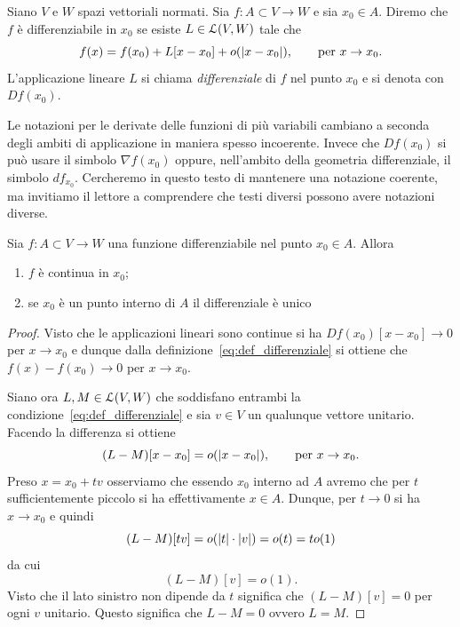 \begin{definition}
  Siano $V$ e $W$ spazi vettoriali normati.
  Sia $f\colon A \subset V \to W$ e sia $x_0\in A$.
  Diremo che $f$ è differenziabile in $x_0$ se esiste 
  $L\in \mathcal L(V,W)$ tale che 
  \begin{equation}\label{eq:def_differenziale}
    f(x) = f(x_0) + L[x- x_0] + o({\left|x - x_0\right|}), 
    \qquad \text{per } x\to x_0.
  \end{equation}
  L'applicazione lineare $L$
  si chiama \emph{differenziale} di $f$ nel punto $x_0$
  e si denota con $Df(x_0)$.
\end{definition}

\begin{remark}
Le notazioni per le derivate delle funzioni di più variabili cambiano 
a seconda degli ambiti di applicazione in maniera spesso incoerente.
Invece che $Df(x_0)$ si può usare il simbolo $\nabla f(x_0)$ oppure,
nell'ambito della geometria differenziale, il simbolo $df_{x_0}$. 
Cercheremo in questo testo di mantenere una notazione coerente, ma
invitiamo il lettore a comprendere che testi diversi possono avere 
notazioni diverse. 
\end{remark}

\begin{theorem}
Sia $f\colon A\subset V \to W$ una funzione 
differenziabile nel punto $x_0\in A$. Allora
\begin{enumerate}
  \item $f$ è continua in $x_0$;
  \item se $x_0$ è un punto interno di $A$
  il differenziale è unico
\end{enumerate}
\end{theorem}
\begin{proof}
Visto che le applicazioni lineari sono continue
si ha $Df(x_0)[x -  x_0]\to 0$ per $x \to x_0$
e dunque dalla definizione~\eqref{eq:def_differenziale} 
si ottiene che $f(x) - f(x_0)\to 0$
per $x \to x_0$. 

Siano ora $L,M\in \mathcal L(V,W)$ che soddisfano entrambi la condizione~\eqref{eq:def_differenziale}
e sia $v\in V$ un qualunque vettore unitario.
Facendo la differenza si ottiene
\[
  (L-M)[x - x_0] = o({\left|x-x_0\right|}), 
  \qquad \text{per } x \to x_0.
\]
Preso $x =  x_0 + t v$ osserviamo che essendo $ x_0$ interno 
ad $A$ avremo che per $t$ sufficientemente piccolo si ha effettivamente 
$ x \in A$. 
Dunque, per $t\to 0$ si ha $ x \to  x_0$ e quindi
\[
  (L-M)[t  v] = o({\left|t\right|}\cdot {\left| v\right|}) = o(t) = t o(1)
\] 
da cui 
\[
  (L-M)[ v] = o(1).
\]
Visto che il lato sinistro non dipende da $t$ 
significa che $(L-M)[ v]=0$ per ogni $ v$ unitario.
Questo significa che $L-M = 0$ ovvero $L=M$.
\end{proof}

